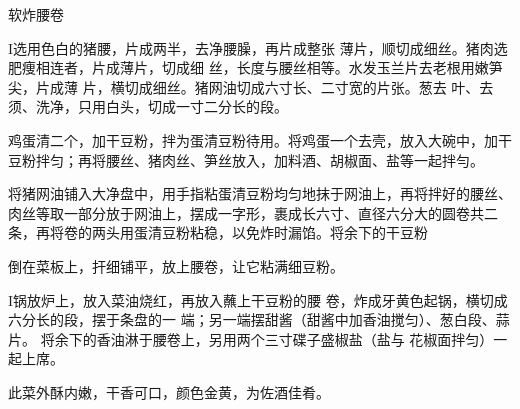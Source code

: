 \begin{recipe}{软炸腰卷}

\ingredients



\cooking

I选用色白的猪腰，片成两半，去净腰臊，再片成整张 薄片，顺切成细丝。猪肉选肥痩相连者，片成薄片，切成细 丝，长度与腰丝相等。水发玉兰片去老根用嫩笋尖，片成薄 片，横切成细丝。猪网油切成六寸长、二寸宽的片张。葱去 叶、去须、洗净，只用白头，切成一寸二分长的段。

\step 鸡蛋清二个，加干豆粉，拌为蛋清豆粉待用。将鸡蛋一个去壳，放入大碗中，加干豆粉拌匀；再将腰丝、猪肉丝、笋丝放入，加料酒、胡椒面、盐等一起拌勻。

\step 将猪网油铺入大净盘中，用手指粘蛋清豆粉均匀地抹于网油上，再将拌好的腰丝、肉丝等取一部分放于网油上，摆成一字形，裹成长六寸、直径六分大的圆卷共二条，再将卷的两头用蛋清豆粉粘稳，以免炸时漏馅。将余下的干豆粉

倒在菜板上，扞细铺平，放上腰卷，让它粘满细豆粉。

I锅放炉上，放入菜油烧红，再放入蘸上干豆粉的腰 卷，炸成牙黄色起锅，横切成六分长的段，摆于条盘的一 端；另一端摆甜酱（甜酱中加香油搅匀）、葱白段、蒜片。 将余下的香油淋于腰卷上，另用两个三寸碟子盛椒盐（盐与 花椒面拌匀）一起上席。

\notes

此菜外酥内嫩，干香可口，颜色金黄，为佐酒佳肴。

\end{recipe}

